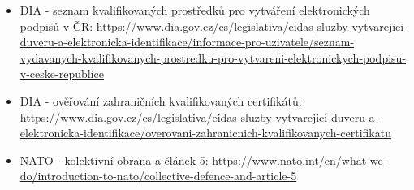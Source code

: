 \begin{itemize}
  \item DIA - seznam kvalifikovaných prostředků pro vytváření elektronických podpisů v ČR: \url{https://www.dia.gov.cz/cs/legislativa/eidas-sluzby-vytvarejici-duveru-a-elektronicka-identifikace/informace-pro-uzivatele/seznam-vydavanych-kvalifikovanych-prostredku-pro-vytvareni-elektronickych-podpisu-v-ceske-republice}
  \item DIA - ověřování zahraničních kvalifikovaných certifikátů: \url{https://www.dia.gov.cz/cs/legislativa/eidas-sluzby-vytvarejici-duveru-a-elektronicka-identifikace/overovani-zahranicnich-kvalifikovanych-certifikatu}
  \item NATO - kolektivní obrana a článek 5: \url{https://www.nato.int/en/what-we-do/introduction-to-nato/collective-defence-and-article-5}
\end{itemize}
